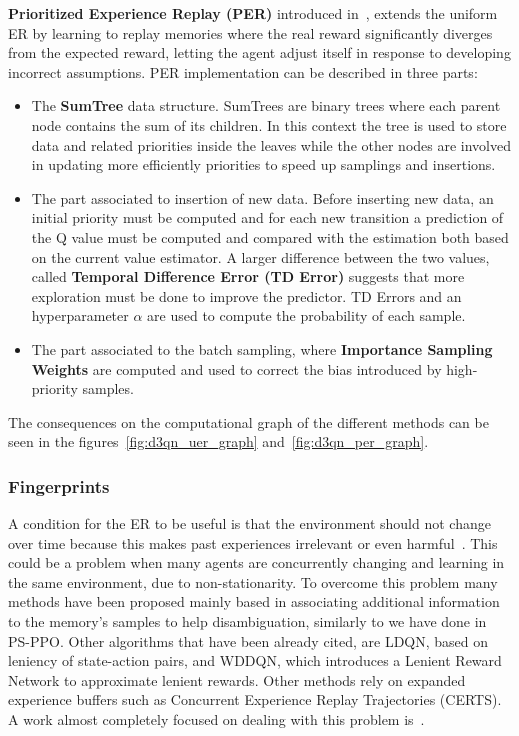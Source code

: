 \documentclass[11pt, a4paper, hidelinks]{report}
\begin{document}
\textbf{Prioritized Experience Replay (PER)} introduced in~\citep{prioritized}, extends the uniform ER by learning to replay memories where the real reward significantly diverges from the expected reward, letting the agent adjust itself in response to developing incorrect assumptions.
PER implementation can be described in three parts:
\begin{itemize}
	\item The \textbf{SumTree} data structure.
SumTrees are binary trees where each parent node contains the sum of its children.
In this context the tree is used to store data and related priorities inside the leaves while the other nodes are involved in updating more efficiently priorities to speed up samplings and insertions.
	\item The part associated to insertion of new data.
Before inserting new data, an initial priority must be computed and for each new transition a prediction of the Q value must be computed and compared with the estimation both based on the current value estimator.
A larger difference between the two values, called \textbf{Temporal Difference Error (TD Error)} suggests that more exploration must be done to improve the predictor.
TD Errors and an hyperparameter $\alpha$ are used to compute the probability of each sample.
	\item The part associated to the batch sampling, where \textbf{Importance Sampling Weights} are computed and used to correct the bias introduced by high-priority samples.
\end{itemize}
The consequences on the computational graph of the different methods can be seen in the figures~\ref{fig:d3qn_uer_graph} and~\ref{fig:d3qn_per_graph}.

\subsubsection{Fingerprints}\label{subsubsec:fingerprints}

A condition for the ER to be useful is that the environment should not change over time because this makes past experiences irrelevant
or even harmful~\citep{Hernandez-Leal-2019}.
This could be a problem when many agents are concurrently changing and learning in the same environment, due to non-stationarity.
To overcome this problem many methods have been proposed mainly based in associating additional information to the memory's samples to help disambiguation, similarly to we have done in PS-PPO\@.
Other algorithms that have been already cited, are LDQN, based on leniency of state-action pairs, and WDDQN, which introduces a Lenient Reward Network to approximate lenient rewards.
Other methods rely on expanded experience buffers such as Concurrent Experience Replay Trajectories (CERTS).
A work almost completely focused on dealing with this problem is~\citep{fingerprints}.
\end{document}
